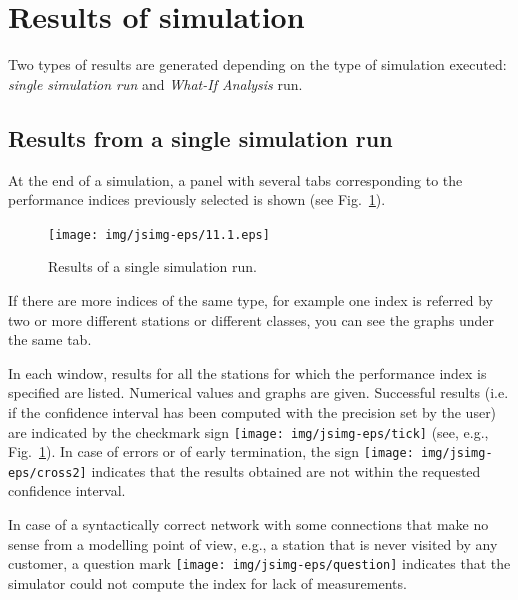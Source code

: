 \section{Results of simulation}
\label{ressults}

Two types of results are generated depending on the type of
simulation executed: \emph{single simulation run} and
\emph{What-If Analysis} run.

\subsection{Results from a single simulation run}
At the end of a simulation, a panel with several tabs
corresponding to the performance indices previously selected is
shown (see Fig.~\ref{fig:ssimrun}).\\
\begin{figure}[htb]
    \begin{center}
        \texttt{[image: img/jsimg-eps/11.1.eps]}
    \end{center}
    \caption{Results of a single simulation run.}
    \label{fig:ssimrun}
\end{figure}
If there are more indices of the same type, for example one index
is referred by two or more different stations or different classes,
you can see the graphs under the same tab.

In each window, results for all the stations for which the
performance index is specified are listed. Numerical values and
graphs are given. Successful results (i.e. if the confidence
interval has been computed with the precision set by the user) are
indicated by the checkmark sign \texttt{[image: img/jsimg-eps/tick]} (see, e.g.,
Fig.~\ref{fig:ssimrun}). In case of errors or of early
termination, the sign \texttt{[image: img/jsimg-eps/cross2]} indicates that the
results obtained are not within the requested confidence interval.

In case of a syntactically correct network with some connections
that make no sense from a modelling point of view, e.g., a station
that is never visited by any customer, a question mark \texttt{[image: img/jsimg-eps/question]}
indicates that the simulator could not
compute the index for lack of measurements.


